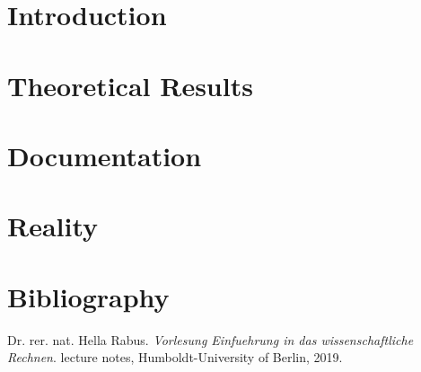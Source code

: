\documentclass[refman]{scrartcl}
\theoremstyle{definition}
\begin{document}
%
%

\newpage
%
%
\section{Introduction}
%

\newpage
%
\section{Theoretical Results}
%


%
\section{Documentation}
%
\section{Reality}
%
\section{Bibliography}
\begin{thebibliography}{9}
    Dr. rer. nat. Hella Rabus. 
    \textit{Vorlesung Einfuehrung in das wissenschaftliche Rechnen}. 
    lecture notes, Humboldt-University of Berlin, 2019.
\end{thebibliography}
\end{document}
